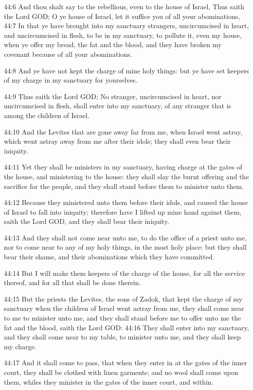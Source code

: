 44:6 And thou shalt say to the rebellious, even to the house of Israel, Thus saith the Lord GOD; O ye house of Israel, let it suffice you of all your abominations, 44:7 In that ye have brought into my sanctuary strangers, uncircumcised in heart, and uncircumcised in flesh, to be in my sanctuary, to pollute it, even my house, when ye offer my bread, the fat and the blood, and they have broken my covenant because of all your abominations.

44:8 And ye have not kept the charge of mine holy things: but ye have set keepers of my charge in my sanctuary for yourselves.

44:9 Thus saith the Lord GOD; No stranger, uncircumcised in heart, nor uncircumcised in flesh, shall enter into my sanctuary, of any stranger that is among the children of Israel.

44:10 And the Levites that are gone away far from me, when Israel went astray, which went astray away from me after their idols; they shall even bear their iniquity.

44:11 Yet they shall be ministers in my sanctuary, having charge at the gates of the house, and ministering to the house: they shall slay the burnt offering and the sacrifice for the people, and they shall stand before them to minister unto them.

44:12 Because they ministered unto them before their idols, and caused the house of Israel to fall into iniquity; therefore have I lifted up mine hand against them, saith the Lord GOD, and they shall bear their iniquity.

44:13 And they shall not come near unto me, to do the office of a priest unto me, nor to come near to any of my holy things, in the most holy place: but they shall bear their shame, and their abominations which they have committed.

44:14 But I will make them keepers of the charge of the house, for all the service thereof, and for all that shall be done therein.

44:15 But the priests the Levites, the sons of Zadok, that kept the charge of my sanctuary when the children of Israel went astray from me, they shall come near to me to minister unto me, and they shall stand before me to offer unto me the fat and the blood, saith the Lord GOD: 44:16 They shall enter into my sanctuary, and they shall come near to my table, to minister unto me, and they shall keep my charge.

44:17 And it shall come to pass, that when they enter in at the gates of the inner court, they shall be clothed with linen garments; and no wool shall come upon them, whiles they minister in the gates of the inner court, and within.

